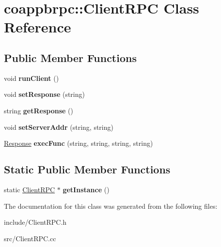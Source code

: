 \hypertarget{classcoappbrpc_1_1ClientRPC}{}\section{coappbrpc\+:\+:Client\+R\+PC Class Reference}
\label{classcoappbrpc_1_1ClientRPC}
\subsection*{Public Member Functions}
\begin{DoxyCompactItemize}
\item 
\mbox{\label{classcoappbrpc_1_1ClientRPC_a53bb77d304bc17ab754a75fccd3a6372}} 
void {\bfseries run\+Client} ()
\item 
\mbox{\label{classcoappbrpc_1_1ClientRPC_a6331d4e08a096a14941ab1af7bdb1893}} 
void {\bfseries set\+Response} (string)
\item 
\mbox{\label{classcoappbrpc_1_1ClientRPC_a2ff7435d4a5ab5c8bf146b623c53f6d7}} 
string {\bfseries get\+Response} ()
\item 
\mbox{\label{classcoappbrpc_1_1ClientRPC_a1a97bb79af368c7f867157dd89e2a2e0}} 
void {\bfseries set\+Server\+Addr} (string, string)
\item 
\mbox{\label{classcoappbrpc_1_1ClientRPC_adb36f3777ba6ffba5a85a93acb3e6718}} 
\hyperlink{classcoappbrpc_1_1Response}{Response} {\bfseries exec\+Func} (string, string, string, string)
\end{DoxyCompactItemize}
\subsection*{Static Public Member Functions}
\begin{DoxyCompactItemize}
\item 
\mbox{\label{classcoappbrpc_1_1ClientRPC_aaae393ce4bcf1200e631b0fe39f54f42}} 
static \hyperlink{classcoappbrpc_1_1ClientRPC}{Client\+R\+PC} $\ast$ {\bfseries get\+Instance} ()
\end{DoxyCompactItemize}


The documentation for this class was generated from the following files\+:\begin{DoxyCompactItemize}
\item 
include/Client\+R\+P\+C.\+h\item 
src/Client\+R\+P\+C.\+cc\end{DoxyCompactItemize}
